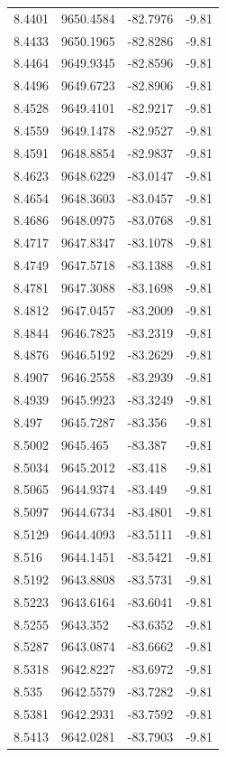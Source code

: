 \begin{table}[H]
\begin{tabular}{llll}
8.4401 & 9650.4584 & -82.7976 & -9.81 \\
8.4433 & 9650.1965 & -82.8286 & -9.81 \\
8.4464 & 9649.9345 & -82.8596 & -9.81 \\
8.4496 & 9649.6723 & -82.8906 & -9.81 \\
8.4528 & 9649.4101 & -82.9217 & -9.81 \\
8.4559 & 9649.1478 & -82.9527 & -9.81 \\
8.4591 & 9648.8854 & -82.9837 & -9.81 \\
8.4623 & 9648.6229 & -83.0147 & -9.81 \\
8.4654 & 9648.3603 & -83.0457 & -9.81 \\
8.4686 & 9648.0975 & -83.0768 & -9.81 \\
8.4717 & 9647.8347 & -83.1078 & -9.81 \\
8.4749 & 9647.5718 & -83.1388 & -9.81 \\
8.4781 & 9647.3088 & -83.1698 & -9.81 \\
8.4812 & 9647.0457 & -83.2009 & -9.81 \\
8.4844 & 9646.7825 & -83.2319 & -9.81 \\
8.4876 & 9646.5192 & -83.2629 & -9.81 \\
8.4907 & 9646.2558 & -83.2939 & -9.81 \\
8.4939 & 9645.9923 & -83.3249 & -9.81 \\
8.497 & 9645.7287 & -83.356 & -9.81 \\
8.5002 & 9645.465 & -83.387 & -9.81 \\
8.5034 & 9645.2012 & -83.418 & -9.81 \\
8.5065 & 9644.9374 & -83.449 & -9.81 \\
8.5097 & 9644.6734 & -83.4801 & -9.81 \\
8.5129 & 9644.4093 & -83.5111 & -9.81 \\
8.516 & 9644.1451 & -83.5421 & -9.81 \\
8.5192 & 9643.8808 & -83.5731 & -9.81 \\
8.5223 & 9643.6164 & -83.6041 & -9.81 \\
8.5255 & 9643.352 & -83.6352 & -9.81 \\
8.5287 & 9643.0874 & -83.6662 & -9.81 \\
8.5318 & 9642.8227 & -83.6972 & -9.81 \\
8.535 & 9642.5579 & -83.7282 & -9.81 \\
8.5381 & 9642.2931 & -83.7592 & -9.81 \\
8.5413 & 9642.0281 & -83.7903 & -9.81 \\

\end{tabular}
\end{table}
